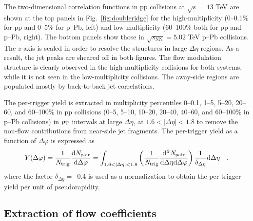 The two-dimensional correlation functions in pp collisions at $\sqrt{s}=13$ TeV are shown at the top panels in Fig.~\ref{fig:doubleridge} for the high-multiplicity (0--0.1\% for pp and 0--5\% for p--Pb, left) and low-multiplicity (60--100\% both for pp and p--Pb, right). The bottom panels show those in $\sqrt{s_{\mathrm{NN}}}=5.02$ TeV p--Pb collisions. 
The $z$-axis is scaled in order to resolve the structures in large $\Delta\eta$ regions.
As a result, the jet peaks are sheared off in both figures. The flow modulation structure is clearly observed in the high-multiplicity collisions for both systems, while it is not seen in the low-multiplicity collisions. The away-side regions are populated mostly by back-to-back jet correlations. 



The per-trigger yield is extracted in multiplicity percentiles 0--0.1, 1--5, 5--20, 20--60, and 60--100\% in pp collisions (0--5, 5--10, 10--20, 20--40, 40--60, and 60--100\% in p--Pb collisions) in $p_\mathrm{T}$ intervals at large $\Delta\eta$, at $1.6<|\Delta\eta|<1.8$ to remove the non-flow contributions from near-side jet fragments. The per-trigger yield as a function of $\Delta\varphi$ is expressed as
\begin{eqnarray}
Y(\Delta\varphi) = \frac{1}{N_{\rm{trig}}} \frac{ \rm{d}\it{}N_{\rm{pair}} }{ \rm{d}\Delta\varphi } = \int_{1.6<|\Delta \eta|<1.8} \left( \frac{1}{\it{N}_{\rm{trig}}} \frac{ \rm{d}\it{}^{2} N_{\rm{pair}} }{ \rm{d}\Delta\eta \rm{d}\Delta\varphi} \right) \dfrac{1}{\delta_{\Delta\eta}} \rm{d}\Delta \eta \quad ,
\label{eq:pertrigger}
\end{eqnarray}
where the factor $\delta_{\Delta\eta}=$~0.4 is used as a normalization to obtain the per trigger yield per unit of pseudorapidity.


\subsection{Extraction of flow coefficients}

